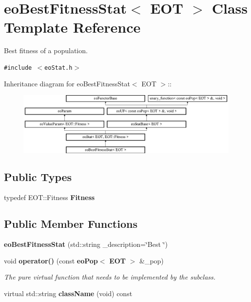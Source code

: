 \section{eo\-Best\-Fitness\-Stat$<$ EOT $>$ Class Template Reference}
\label{classeo_best_fitness_stat}
Best fitness of a population.  


{\tt \#include $<$eo\-Stat.h$>$}

Inheritance diagram for eo\-Best\-Fitness\-Stat$<$ EOT $>$::\begin{figure}[H]
\begin{center}
\leavevmode
\includegraphics[height=3.15315cm]{classeo_best_fitness_stat}
\end{center}
\end{figure}
\subsection*{Public Types}
\begin{CompactItemize}
\item 
typedef EOT::Fitness {\bf Fitness}\label{classeo_best_fitness_stat_w0}

\end{CompactItemize}
\subsection*{Public Member Functions}
\begin{CompactItemize}
\item 
{\bf eo\-Best\-Fitness\-Stat} (std::string \_\-description=\char`\"{}Best \char`\"{})\label{classeo_best_fitness_stat_a0}

\item 
void {\bf operator()} (const {\bf eo\-Pop}$<$ {\bf EOT} $>$ \&\_\-pop)\label{classeo_best_fitness_stat_a1}

\begin{CompactList}\small\item\em The pure virtual function that needs to be implemented by the subclass. \item\end{CompactList}\item 
virtual std::string {\bf class\-Name} (void) const \label{classeo_best_fitness_stat_a2}

\end{CompactItemize}
